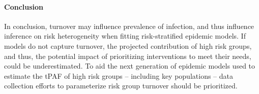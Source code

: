 \paragraph{Conclusion}
In conclusion, turnover may influence prevalence of infection, and
thus influence inference on risk heterogeneity
when fitting risk-stratified epidemic models.
If models do not capture turnover,
the projected contribution of high risk groups, and thus,
the potential impact of prioritizing interventions to meet their needs, could be underestimated.
To aid the next generation of epidemic models
used to estimate the tPAF of high risk groups -- including key populations --
data collection efforts to parameterize risk group turnover should be prioritized.
